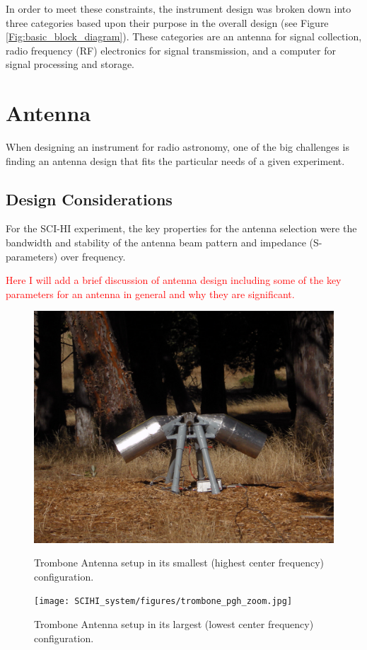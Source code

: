 In order to meet these constraints, the instrument design was broken down into three categories based upon their purpose in the overall design (see Figure \ref{Fig:basic_block_diagram}). These categories are an antenna for signal collection, radio frequency (RF) electronics for signal transmission, and a computer for signal processing and storage.

\section{Antenna}
When designing an instrument for radio astronomy, one of the big challenges is finding an antenna design that fits the particular needs of a given experiment. 

\subsection{Design Considerations}
For the SCI-HI experiment, the key properties for the antenna selection were the bandwidth and stability of the antenna beam pattern and impedance (S-parameters) over frequency. 

\textcolor{red}{Here I will add a brief discussion of antenna design including some of the key parameters for an antenna in general and why they are significant. }

\begin{figure}[htb]
\centering
\begin{minipage}[b]{0.45\textwidth}
\centering
\includegraphics[width=0.95\linewidth]{SCIHI_system/figures/trombone_guad_small.jpg}
\caption{Trombone Antenna setup in its smallest (highest center frequency) configuration.}
\label{Fig:trombone_small}
\end{minipage}%
\begin{minipage}[b]{0.02\textwidth}
\hspace{1cm}
\end{minipage}%
\begin{minipage}[b]{0.51\textwidth}
\centering
\texttt{[image: SCIHI\_system/figures/trombone\_pgh\_zoom.jpg]}
\caption{Trombone Antenna setup in its largest (lowest center frequency) configuration.}
\label{Fig:trombone_large}
\end{minipage}
\end{figure}

